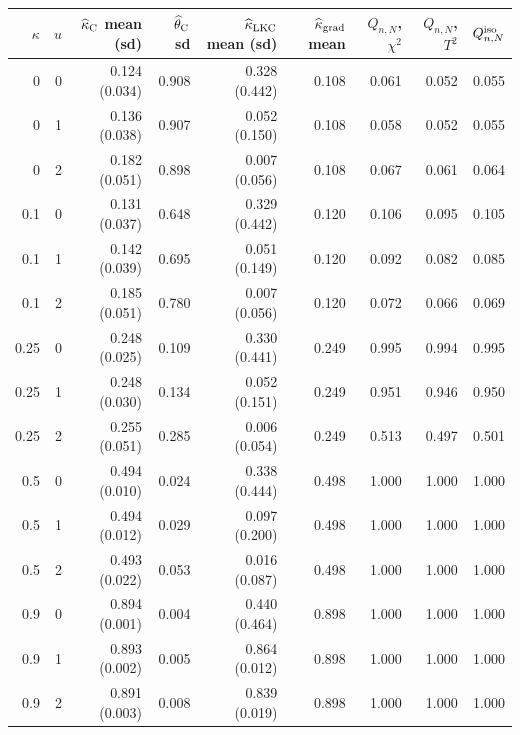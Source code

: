 \begin{tabular}{rrrrrrrrr}
\hline
$\kappa$ & $u$ & $\widehat\kappa_{\rm C}$ mean (sd) & $\widehat\theta_{\rm C}$ sd & $\widehat\kappa_{\rm LKC}$ mean (sd) & $\widehat\kappa_{\rm grad}$ mean & $Q_{n,N}$, $\chi^2$ & $Q_{n,N}$, $T^2$ & $Q^{\rm iso}_{n,N}$ \\
\hline
0 & 0 & 0.124 (0.034) & 0.908 & 0.328 (0.442) & 0.108 & 0.061 & 0.052 & 0.055 \\
0 & 1 & 0.136 (0.038) & 0.907 & 0.052 (0.150) & 0.108 & 0.058 & 0.052 & 0.055 \\
0 & 2 & 0.182 (0.051) & 0.898 & 0.007 (0.056) & 0.108 & 0.067 & 0.061 & 0.064 \\
0.1 & 0 & 0.131 (0.037) & 0.648 & 0.329 (0.442) & 0.120 & 0.106 & 0.095 & 0.105 \\
0.1 & 1 & 0.142 (0.039) & 0.695 & 0.051 (0.149) & 0.120 & 0.092 & 0.082 & 0.085 \\
0.1 & 2 & 0.185 (0.051) & 0.780 & 0.007 (0.056) & 0.120 & 0.072 & 0.066 & 0.069 \\
0.25 & 0 & 0.248 (0.025) & 0.109 & 0.330 (0.441) & 0.249 & 0.995 & 0.994 & 0.995 \\
0.25 & 1 & 0.248 (0.030) & 0.134 & 0.052 (0.151) & 0.249 & 0.951 & 0.946 & 0.950 \\
0.25 & 2 & 0.255 (0.051) & 0.285 & 0.006 (0.054) & 0.249 & 0.513 & 0.497 & 0.501 \\
0.5 & 0 & 0.494 (0.010) & 0.024 & 0.338 (0.444) & 0.498 & 1.000 & 1.000 & 1.000 \\
0.5 & 1 & 0.494 (0.012) & 0.029 & 0.097 (0.200) & 0.498 & 1.000 & 1.000 & 1.000 \\
0.5 & 2 & 0.493 (0.022) & 0.053 & 0.016 (0.087) & 0.498 & 1.000 & 1.000 & 1.000 \\
0.9 & 0 & 0.894 (0.001) & 0.004 & 0.440 (0.464) & 0.898 & 1.000 & 1.000 & 1.000 \\
0.9 & 1 & 0.893 (0.002) & 0.005 & 0.864 (0.012) & 0.898 & 1.000 & 1.000 & 1.000 \\
0.9 & 2 & 0.891 (0.003) & 0.008 & 0.839 (0.019) & 0.898 & 1.000 & 1.000 & 1.000 \\
\hline
\end{tabular}
